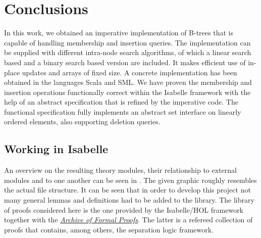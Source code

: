 

\chapter{Conclusions}\label{chapter:conclusion}

In this work, we obtained an imperative implementation
of B-trees that is capable of handling membership and insertion queries.
The implementation can be supplied with different
intra-node search algorithms, of which a linear search based
and a binary search based version are included.
It makes efficient use of in-place updates
and arrays of fixed size.
A concrete implementation has been obtained in the languages Scala and SML.
We have proven the membership and insertion operations
functionally correct within the Isabelle framework
with the help of an abstract specification
that is refined by the imperative code.
The functional specification fully implements
an abstract set interface on linearly ordered elements,
also supporting deletion queries.

\section{Working in Isabelle}

An overview on the resulting theory modules,
their relationship to external modules and to one another
can be seen in .
The given graphic roughly resembles the actual file structure.
It can be seen that in order to develop this project
not many general lemmas and definitions had to be added to the library.
The library of proofs considered here
is the one provided by the Isabelle/HOL framework together with the \href{https://www.isa-afp.org}{\textit{Archive of Formal Proofs}}.
The latter is a refereed collection of proofs that contains, among others,
the separation logic framework.

